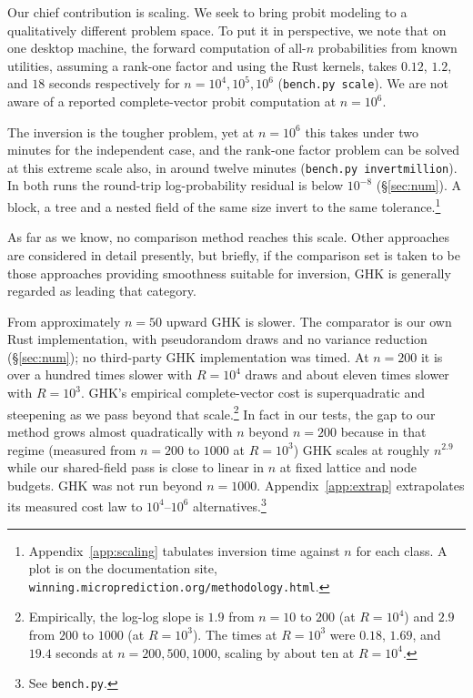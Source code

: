 \documentclass[11pt]{article}
\begin{document}
Our chief contribution is scaling. We seek to bring probit modeling to a qualitatively different problem space.  To put it in perspective, we note that on one desktop machine, the forward computation of all-$n$ probabilities from known utilities, assuming a rank-one factor and using the Rust kernels, takes $0.12$, $1.2$, and $18$ seconds respectively for $n=10^{4},10^{5},10^{6}$ (\texttt{bench.py scale}). We are not aware of a reported complete-vector probit computation at $n=10^{6}$.

The inversion is the tougher problem, yet at $n=10^{6}$ this takes under two minutes for the independent case, and the rank-one factor problem can be solved at this
extreme scale also, in around twelve minutes (\texttt{bench.py invertmillion}). In both runs the round-trip log-probability residual is below $10^{-8}$ (\S\ref{sec:num}). A block, a tree and a nested field of the same size invert to the same tolerance.\footnote{Appendix~\ref{app:scaling} tabulates inversion time against $n$ for each class. A plot is on the documentation site, \texttt{winning.microprediction.org/methodology.html}.}

As far as we know, no comparison method reaches this scale. Other approaches are considered in detail presently, but briefly, if the comparison set is taken to be those approaches providing smoothness suitable for inversion, GHK is generally regarded as leading that category.

From approximately $n=50$ upward GHK is slower. The comparator is our own Rust implementation, with pseudorandom draws and no variance reduction (\S\ref{sec:num}); no third-party GHK implementation was timed. At $n=200$ it is over a hundred times slower with $R=10^{4}$ draws and about eleven times slower with $R=10^{3}$. GHK's empirical complete-vector cost is superquadratic and steepening as we pass beyond that scale.\footnote{Empirically, the log-log slope is
$1.9$ from $n=10$ to $200$ (at $R=10^{4}$) and $2.9$ from $200$ to $1000$
(at $R=10^{3}$). The times at $R=10^{3}$ were $0.18$, $1.69$, and $19.4$
seconds at $n=200,500,1000$, scaling by about ten at $R=10^{4}$.} In fact in our tests, the gap to our method grows almost quadratically with $n$ beyond $n=200$ because in that regime (measured from $n=200$ to $1000$ at $R=10^{3}$) GHK scales at roughly $n^{2.9}$ while our shared-field pass is close to linear in $n$ at fixed
lattice and node budgets. GHK was not run beyond $n=1000$. Appendix~\ref{app:extrap} extrapolates its measured cost law to
$10^{4}$--$10^{6}$ alternatives.\footnote{See \texttt{bench.py}.}
\end{document}
